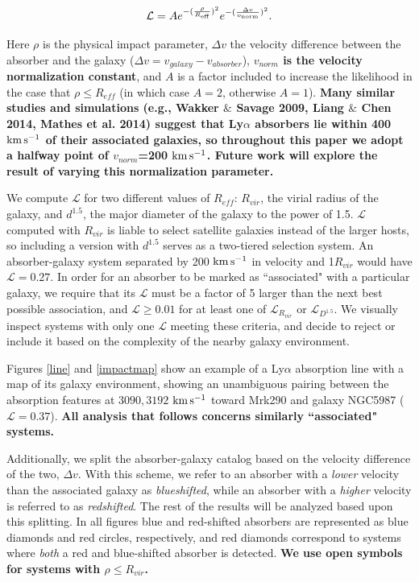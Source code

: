 \documentclass[twocolumn,tighten]{aastex6}
\begin{document}
\begin{equation}
	\mathcal{L} = A e^{-(\frac{\rho}{R_{\rm eff}})^2} e^{-(\frac{\Delta v}{v_{\rm norm}})^2}.
\end{equation}

\noindent Here $\rho$ is the physical impact parameter, $\Delta v$ the velocity difference between the absorber and the galaxy ($\Delta v = v_{galaxy} - v_{absorber}$), \textbf{$v_{norm}$ is the velocity normalization constant}, and $A$ is a factor included to increase the likelihood in the case that $\rho \leq R_{eff}$ (in which case $A = 2$, otherwise $A = 1$). \textbf{Many similar studies and simulations (e.g., Wakker $\&$ Savage 2009, Liang $\&$ Chen 2014, Mathes et al. 2014) suggest that Ly$\alpha$ absorbers lie within 400 $\rm km\, s^{-1}$ of their associated galaxies, so throughout this paper we adopt a halfway point of $v_{norm}$=200 $\rm km\, s^{-1}$. Future work will explore the result of varying this normalization parameter.}

We compute $\mathcal{L}$ for two different values of $R_{eff}$: $R_{vir}$, the virial radius of the galaxy, and $d^{1.5}$, the major diameter of the galaxy to the power of 1.5. $\mathcal{L}$ computed with $R_{vir}$ is liable to select satellite galaxies instead of the larger hosts, so including a version with $d^{1.5}$ serves as a two-tiered selection system. An absorber-galaxy system separated by 200 $\rm km\, s^{-1}$ in velocity and 1$R_{vir}$ would have $\mathcal{L} = 0.27$. In order for an absorber to be marked as ``associated" with a particular galaxy, we require that its $\mathcal{L}$ must be a factor of 5 larger than the next best possible association, and $\mathcal{L} \ge 0.01$ for at least one of $\mathcal{L}_{R_{vir}}$ or $\mathcal{L}_{D^{1.5}}$. We visually inspect systems with only one $\mathcal{L}$ meeting these criteria, and decide to reject or include it based on the complexity of the nearby galaxy environment. 

Figures \ref{line} and \ref{impactmap} show an example of a Ly$\alpha$ absorption line with a map of its galaxy environment, showing an unambiguous pairing between the absorption features at $3090, 3192$ $\rm km\, s^{-1}$ toward Mrk290 and galaxy NGC5987 ($\mathcal{L} = 0.37$). \textbf{All analysis that follows concerns similarly ``associated" systems.}

Additionally, we split the absorber-galaxy catalog based on the velocity difference of the two, $\Delta v$. With this scheme, we refer to an absorber with a \textit{lower} velocity than the associated galaxy as \textit{blueshifted}, while an absorber with a \textit{higher} velocity is referred to as \textit{redshifted}. The rest of the results will be analyzed based upon this splitting. In all figures blue and red-shifted absorbers are represented as blue diamonds and red circles, respectively, and red diamonds correspond to systems where \textit{both} a red and blue-shifted absorber is detected. \textbf{We use open symbols for systems with $\rho \leq R_{vir}$.}
\end{document}
